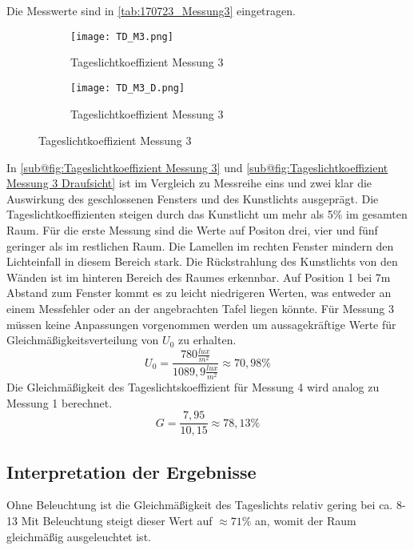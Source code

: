     Die Messwerte sind in \autoref{tab:170723_Messung3} eingetragen.
  \begin{figure}[H]
  \centering
  \begin{subfigure}[c]{0.5\textwidth}
      \texttt{[image: TD\_M3.png]}
      \caption{Tageslichtkoeffizient Messung 3}
      \label{fig:Tageslichtkoeffizient Messung 3}
  \end{subfigure}
  \hfill
  \begin{subfigure}[c]{0.45\textwidth}
      \texttt{[image: TD\_M3\_D.png]}
      \caption{Tageslichtkoeffizient Messung 3}
      \label{fig:Tageslichtkoeffizient Messung 3 Draufsicht}
  \end{subfigure}
  \label{fig:Messung 3 Tageslichtkoeffizient}
  \end{figure}
  In \autoref{sub@fig:Tageslichtkoeffizient Messung 3} und \autoref{sub@fig:Tageslichtkoeffizient Messung 3 Draufsicht} ist im Vergleich zu Messreihe eins und zwei klar die Auswirkung des geschlossenen Fensters und des Kunstlichts ausgeprägt.
  Die Tageslichtkoeffizienten steigen durch das Kunstlicht um mehr als 5\% im gesamten Raum.  Für die erste Messung sind die Werte auf Positon drei, vier und fünf geringer als im restlichen Raum. Die Lamellen im rechten Fenster mindern den Lichteinfall in diesem Bereich stark. Die Rückstrahlung des Kunstlichts von den Wänden ist im hinteren Bereich des Raumes erkennbar. Auf Position 1 bei 7m Abstand zum Fenster kommt es zu leicht niedrigeren Werten, was entweder an einem Messfehler oder an der angebrachten Tafel liegen könnte.
Für Messung 3 müssen keine Anpassungen vorgenommen werden um aussagekräftige Werte für Gleichmäßigkeitsverteilung von $U_0$ zu erhalten.
  $$U_0 = \frac{780\frac{lux}{m^2}}{1089,9\frac{lux}{m^2}}\approx 70,98\%$$
  Die Gleichmäßigkeit des Tageslichtskoeffizient für Messung 4 wird analog zu Messung 1 berechnet.
  $$G = \frac{7,95}{10,15}\approx 78,13\%$$
\newpage
\subsection{Interpretation der Ergebnisse}
Ohne Beleuchtung ist die Gleichmäßigkeit des Tageslichts relativ gering bei ca. 8-13%
Mit Beleuchtung steigt dieser Wert auf $\approx 71\%$ an, womit der Raum gleichmäßig ausgeleuchtet ist.

